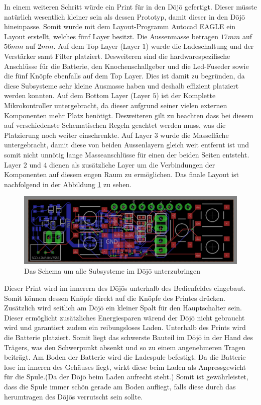 In einem weiteren Schritt würde ein Print für in den Dōjō gefertigt. Dieser müsste natürlich wesentlich kleiner sein als dessen Prototyp, damit dieser in den Dōjō hineinpasse. Somit wurde mit dem Layout-Programm Autocad EAGLE ein Layout erstellt, welches fünf Layer besitzt. Die Aussenmasse betragen $17mm$ auf $56mm$ auf $2mm$. Auf dem Top Layer (Layer $1$) wurde die Ladeschaltung und der Verstärker samt Filter platziert. Desweiteren sind die  hardwarespezifische Anschlüsse für die Batterie, den Knochenschallgeber und die Led-Fuseder sowie die fünf Knöpfe ebenfalls auf dem Top Layer. Dies ist damit zu begründen, da diese Subsysteme sehr kleine Ausmasse haben und deshalb effizient platziert werden konnten. Auf dem Bottom Layer (Layer $5$) ist der Komplette Mikrokontroller untergebracht, da dieser aufgrund seiner vielen externen Komponenten mehr Platz benötigt. Desweiteren gilt zu beachten dass bei diesem auf verschiedenste Schematischen Regeln geachtet werden muss, was die Platzierung noch weiter einschrenkte. Auf Layer $3$ wurde die Massefläche untergebracht, damit diese von beiden Aussenlayern gleich weit entfernt ist und somit nicht unnötig lange Masseanschlüsse für einen der beiden Seiten entsteht. Layer $2$ und $4$ dienen als zusätzliche Layer um die Verbindungen der Komponenten auf diesem engen Raum zu ermöglichen. Das finale Layout ist nachfolgend in der Abbildung \ref{fig:Dojo_layout} zu sehen.
\begin{figure}[H]
	\begin{center}
		\includegraphics[width=160mm]{data/dojo_layout.png}
		\caption[Das Schema um alle Subsysteme im Dōjō unterzubringen]{Das Schema um alle Subsysteme im Dōjō unterzubringen} %
		\label{fig:Dojo_layout}
	\end{center}
\end{figure}

Dieser Print wird im innerern des Dōjōs unterhalb des Bedienfeldes eingebaut. Somit können dessen Knöpfe direkt auf die Knöpfe des Printes drücken. Zusätzlich wird seitlich am Dōjō ein kleiner Spalt für den Hauptschalter sein. Dieser ermöglicht zusätzliches Energiesparen wärend der Dōjō nicht gebraucht wird und garantiert zudem ein reibungsloses Laden. Unterhalb des Prints wird die Batterie platziert. Somit liegt das schwerste Bauteil im Dōjō in der Hand des Trägers, was den Schwerpunkt absenkt und so zu einem angenehmeren Tragen beiträgt. Am Boden der Batterie wird die Ladespule befestigt. Da die Batterie lose im inneren des Gehäuses liegt, wirkt diese beim Laden als Anpressgewicht für die Spule.(Da der Dōjō beim Laden aufrecht steht.) Somit ist gewährleistet, dass die Spule immer schön gerade am Boden aufliegt, falls diese durch das herumtragen des Dōjōs verrutscht sein sollte. 
 
